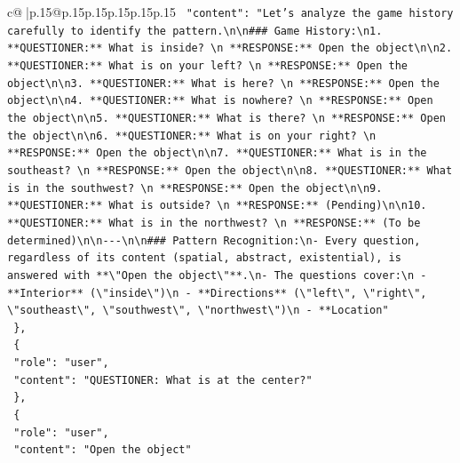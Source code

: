 \documentclass{article}
\begin{document}
{\begin{supertabular}{c@{$\;$}|p{.15\linewidth}@{}p{.15\linewidth}p{.15\linewidth}p{.15\linewidth}p{.15\linewidth}p{.15\linewidth}}
{{{\texttt{    "content": "Let's analyze the game history carefully to identify the pattern.\textbackslash{}n\textbackslash{}n\#\#\# Game History:\textbackslash{}n1. **QUESTIONER:** What is inside?  \textbackslash{}n   **RESPONSE:** Open the object\textbackslash{}n\textbackslash{}n2. **QUESTIONER:** What is on your left?  \textbackslash{}n   **RESPONSE:** Open the object\textbackslash{}n\textbackslash{}n3. **QUESTIONER:** What is here?  \textbackslash{}n   **RESPONSE:** Open the object\textbackslash{}n\textbackslash{}n4. **QUESTIONER:** What is nowhere?  \textbackslash{}n   **RESPONSE:** Open the object\textbackslash{}n\textbackslash{}n5. **QUESTIONER:** What is there?  \textbackslash{}n   **RESPONSE:** Open the object\textbackslash{}n\textbackslash{}n6. **QUESTIONER:** What is on your right?  \textbackslash{}n   **RESPONSE:** Open the object\textbackslash{}n\textbackslash{}n7. **QUESTIONER:** What is in the southeast?  \textbackslash{}n   **RESPONSE:** Open the object\textbackslash{}n\textbackslash{}n8. **QUESTIONER:** What is in the southwest?  \textbackslash{}n   **RESPONSE:** Open the object\textbackslash{}n\textbackslash{}n9. **QUESTIONER:** What is outside?  \textbackslash{}n   **RESPONSE:** (Pending)\textbackslash{}n\textbackslash{}n10. **QUESTIONER:** What is in the northwest?  \textbackslash{}n   **RESPONSE:** (To be determined)\textbackslash{}n\textbackslash{}n{-}{-}{-}\textbackslash{}n\textbackslash{}n\#\#\# Pattern Recognition:\textbackslash{}n{-} Every question, regardless of its content (spatial, abstract, existential), is answered with **\textbackslash{}"Open the object\textbackslash{}"**.\textbackslash{}n{-} The questions cover:\textbackslash{}n  {-} **Interior** (\textbackslash{}"inside\textbackslash{}")\textbackslash{}n  {-} **Directions** (\textbackslash{}"left\textbackslash{}", \textbackslash{}"right\textbackslash{}", \textbackslash{}"southeast\textbackslash{}", \textbackslash{}"southwest\textbackslash{}", \textbackslash{}"northwest\textbackslash{}")\textbackslash{}n  {-} **Location"} \\
\texttt{  \},} \\
\texttt{  \{} \\
\texttt{    "role": "user",} \\
\texttt{    "content": "QUESTIONER: What is at the center?"} \\
\texttt{  \},} \\
\texttt{  \{} \\
\texttt{    "role": "user",} \\
\texttt{    "content": "Open the object"} \\
}}}
\end{supertabular}}
\end{document}
